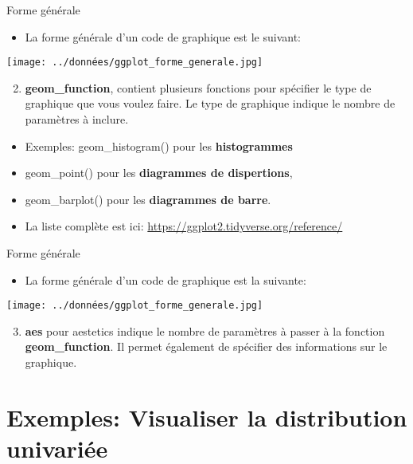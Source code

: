 \documentclass[
  ignorenonframetext,
]{beamer}
\providecommand{\tightlist}{%
  \setlength{\itemsep}{0pt}\setlength{\parskip}{0pt}}
\begin{document}
\begin{frame}{Forme générale}
\protect\hypertarget{forme-guxe9nuxe9rale-1}{}
\begin{itemize}
\tightlist
\item
  La forme générale d'un code de graphique est le suivant:
\end{itemize}

\texttt{[image: ../données/ggplot\_forme\_generale.jpg]}

\begin{enumerate}
\setcounter{enumi}{1}
\tightlist
\item
  \textbf{geom\_function}, contient plusieurs fonctions pour spécifier
  le type de graphique que vous voulez faire. Le type de graphique
  indique le nombre de paramètres à inclure.
\end{enumerate}

\begin{itemize}
\tightlist
\item
  Exemples: geom\_histogram() pour les \textbf{histogrammes}
\item
  geom\_point() pour les \textbf{diagrammes de dispertions},
\item
  geom\_barplot() pour les \textbf{diagrammes de barre}.
\item
  La liste complète est ici:
  \url{https://ggplot2.tidyverse.org/reference/}
\end{itemize}
\end{frame}

\begin{frame}{Forme générale}
\protect\hypertarget{forme-guxe9nuxe9rale-2}{}
\begin{itemize}
\tightlist
\item
  La forme générale d'un code de graphique est la suivante:
\end{itemize}

\texttt{[image: ../données/ggplot\_forme\_generale.jpg]}

\begin{enumerate}
\setcounter{enumi}{2}
\tightlist
\item
  \textbf{aes} pour aestetics indique le nombre de paramètres à passer à
  la fonction \textbf{geom\_function}. Il permet également de spécifier
  des informations sur le graphique.
\end{enumerate}
\end{frame}

\hypertarget{exemples-visualiser-la-distribution-univariuxe9e}{%
\section{Exemples: Visualiser la distribution
univariée}\label{exemples-visualiser-la-distribution-univariuxe9e}}
\end{document}

